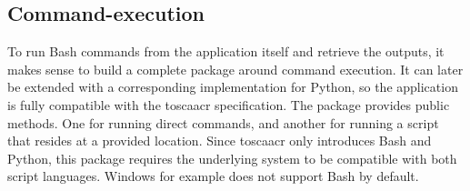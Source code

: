 \subsection{Command-execution}
To run Bash commands from the application itself and retrieve the outputs, it makes sense to build a complete package around command execution. It can later be extended with a corresponding implementation for Python, so the application is fully compatible with the \gls{toscaacr} specification.
\newline
The package provides public methods. One for running direct commands, and another for running a script that resides at a provided location.
\newline
Since \gls{toscaacr} only introduces Bash and Python, this package requires the underlying system to be compatible with both script languages. Windows for example does not support Bash by default.

